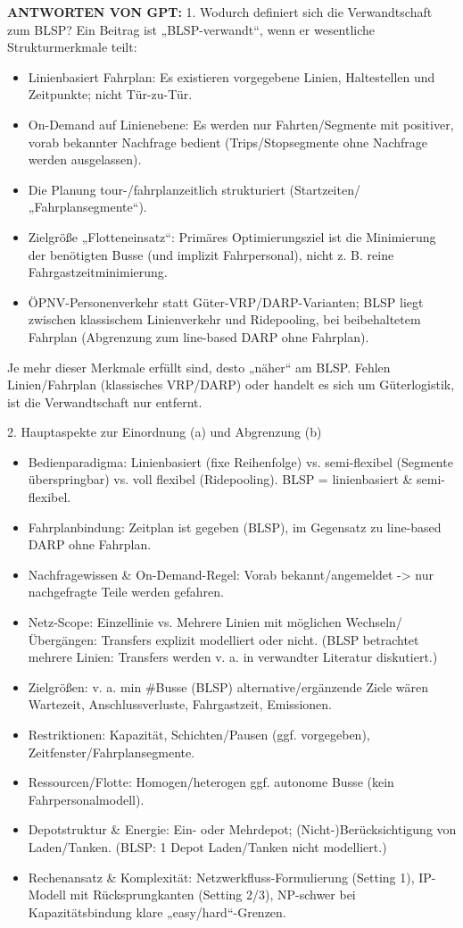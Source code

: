 \textbf{ANTWORTEN VON GPT:}
1. Wodurch definiert sich die Verwandtschaft zum BLSP?
Ein Beitrag ist „BLSP-verwandt“, wenn er wesentliche Strukturmerkmale teilt:
\begin{itemize}
    \item Linienbasiert  Fahrplan: Es existieren vorgegebene Linien, Haltestellen und Zeitpunkte; nicht Tür-zu-Tür.
    \item On-Demand auf Linienebene: Es werden nur Fahrten/Segmente mit positiver, vorab bekannter Nachfrage bedient (Trips/Stopsegmente ohne Nachfrage werden ausgelassen).
    \item Die Planung tour-/fahrplanzeitlich strukturiert (Startzeiten/„Fahrplansegmente“).
    \item Zielgröße „Flotteneinsatz“: Primäres Optimierungsziel ist die Minimierung der benötigten Busse (und implizit Fahrpersonal), nicht z. B. reine Fahrgastzeitminimierung.
    \item ÖPNV-Personenverkehr statt Güter-VRP/DARP-Varianten; BLSP liegt zwischen klassischem Linienverkehr und Ridepooling, bei beibehaltetem Fahrplan (Abgrenzung zum line-based DARP ohne Fahrplan).
\end{itemize}
Je mehr dieser Merkmale erfüllt sind, desto „näher“ am BLSP. Fehlen Linien/Fahrplan (klassisches VRP/DARP) oder handelt es sich um Güterlogistik, ist die Verwandtschaft nur entfernt.

2. Hauptaspekte zur Einordnung (a) und Abgrenzung (b)

\begin{itemize}
    \item Bedienparadigma: Linienbasiert (fixe Reihenfolge) vs. semi-flexibel (Segmente überspringbar) vs. voll flexibel (Ridepooling). BLSP = linienbasiert \& semi-flexibel.
    \item Fahrplanbindung: Zeitplan ist gegeben (BLSP), im Gegensatz zu line-based DARP ohne Fahrplan.
    \item Nachfragewissen \& On-Demand-Regel: Vorab bekannt/angemeldet -> nur nachgefragte Teile werden gefahren.
    \item Netz-Scope: Einzellinie vs. Mehrere Linien mit möglichen Wechseln/Übergängen: Transfers explizit modelliert oder nicht. (BLSP betrachtet mehrere Linien: Transfers werden v. a. in verwandter Literatur diskutiert.)
    \item Zielgrößen: v. a. min \#Busse (BLSP) alternative/ergänzende Ziele wären Wartezeit, Anschlussverluste, Fahrgastzeit, Emissionen.
    \item Restriktionen: Kapazität, Schichten/Pausen (ggf. vorgegeben), Zeitfenster/Fahrplansegmente.
    \item Ressourcen/Flotte: Homogen/heterogen ggf. autonome Busse (kein Fahrpersonalmodell).
    \item Depotstruktur \& Energie: Ein- oder Mehrdepot; (Nicht-)Berücksichtigung von Laden/Tanken. (BLSP: 1 Depot Laden/Tanken nicht modelliert.)
    \item Rechenansatz \& Komplexität: Netzwerkfluss-Formulierung (Setting 1), IP-Modell mit Rücksprungkanten (Setting 2/3), NP-schwer bei Kapazitätsbindung klare „easy/hard“-Grenzen.
\end{itemize}

